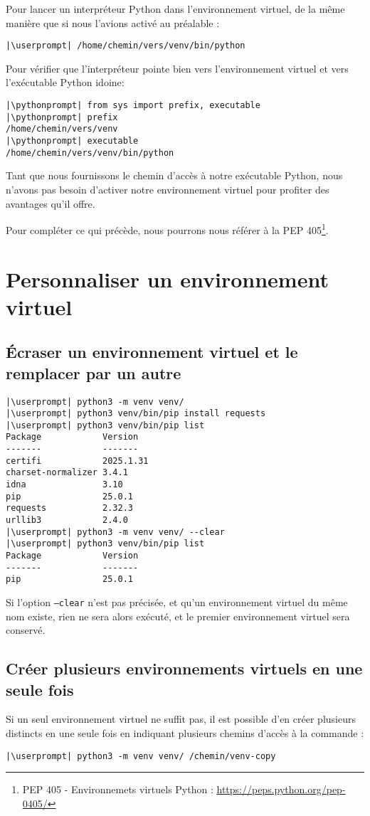 Pour lancer un interpréteur Python dans l'environnement virtuel, de la même manière que si nous l'avions activé au préalable :
\begin{lstlisting}[style=bash]
|\userprompt| /home/chemin/vers/venv/bin/python
\end{lstlisting}

Pour vérifier que l'interpréteur pointe bien vers l'environnement virtuel  et vers l'exécutable Python idoine:
\begin{lstlisting}[style=repl]
|\pythonprompt| from sys import prefix, executable
|\pythonprompt| prefix
/home/chemin/vers/venv
|\pythonprompt| executable
/home/chemin/vers/venv/bin/python
\end{lstlisting}

Tant que nous fournissons le chemin d'accès à notre exécutable Python, nous n'avons pas besoin d'activer notre environnement virtuel pour profiter des avantages qu'il offre.

Pour compléter ce qui précède, nous pourrons nous référer à la PEP 405\footnote{PEP 405 - Environnemets virtuels Python : \url{https://peps.python.org/pep-0405/}}. 
\section{Personnaliser un environnement virtuel}
\subsection*{Écraser un environnement virtuel et le remplacer par un autre}
\begin{lstlisting}[style=bash]
|\userprompt| python3 -m venv venv/
|\userprompt| python3 venv/bin/pip install requests
|\userprompt| python3 venv/bin/pip list
Package            Version
-------            -------
certifi            2025.1.31
charset-normalizer 3.4.1
idna               3.10
pip                25.0.1
requests           2.32.3
urllib3            2.4.0
|\userprompt| python3 -m venv venv/ --clear
|\userprompt| python3 venv/bin/pip list
Package            Version
-------            -------
pip                25.0.1
\end{lstlisting}

Si l'option \texttt{--clear} n'est pas précisée, et qu'un environnement virtuel du même nom existe, rien ne sera alors exécuté, et le premier environnement virtuel sera conservé.

\subsection*{Créer plusieurs environnements virtuels en une seule fois}
Si un seul environnement virtuel ne suffit pas, il est possible d'en créer plusieurs distincts en une seule fois en indiquant plusieurs chemins d'accès à la commande :
\begin{lstlisting}[style=bash]
|\userprompt| python3 -m venv venv/ /chemin/venv-copy
\end{lstlisting}


